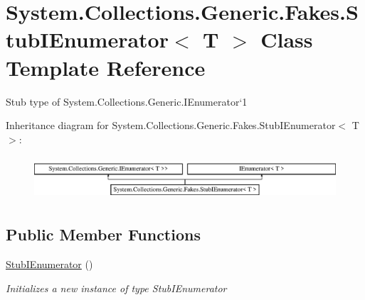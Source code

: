 \hypertarget{class_system_1_1_collections_1_1_generic_1_1_fakes_1_1_stub_i_enumerator_3_01_t_01_4}{\section{System.\-Collections.\-Generic.\-Fakes.\-Stub\-I\-Enumerator$<$ T $>$ Class Template Reference}
\label{class_system_1_1_collections_1_1_generic_1_1_fakes_1_1_stub_i_enumerator_3_01_t_01_4}
}


Stub type of System.\-Collections.\-Generic.\-I\-Enumerator`1 


Inheritance diagram for System.\-Collections.\-Generic.\-Fakes.\-Stub\-I\-Enumerator$<$ T $>$\-:\begin{figure}[H]
\begin{center}
\leavevmode
\includegraphics[height=1.642229cm]{class_system_1_1_collections_1_1_generic_1_1_fakes_1_1_stub_i_enumerator_3_01_t_01_4}
\end{center}
\end{figure}
\subsection*{Public Member Functions}
\begin{DoxyCompactItemize}
\item 
\hyperlink{class_system_1_1_collections_1_1_generic_1_1_fakes_1_1_stub_i_enumerator_3_01_t_01_4_ae1bd98b25714c28165e3c82a480dd3ea}{Stub\-I\-Enumerator} ()
\begin{DoxyCompactList}\small\item\em Initializes a new instance of type Stub\-I\-Enumerator\end{DoxyCompactList}\end{DoxyCompactItemize}
